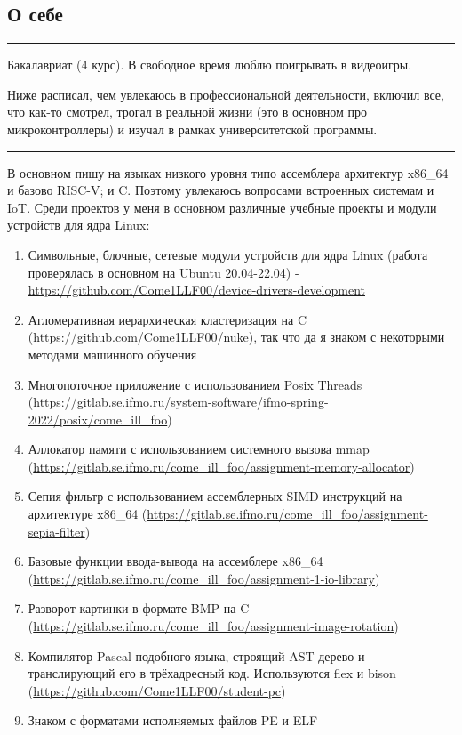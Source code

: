 \documentclass[10pt, final, twoside]{article}
\begin{document}
  \subsection*{\textcolor{darkgray2}{О себе}}
  \vspace*{-5.5mm}
  \par\noindent\rule{\textwidth}{0.1pt}
  
Бакалавриат (4 курс). В свободное время люблю поигрывать в видеоигры.

Ниже расписал, чем увлекаюсь в профессиональной деятельности, включил все, что как-то смотрел, трогал в реальной жизни (это в основном про микроконтроллеры) и изучал в рамках университетской программы.

\par\noindent\rule{\textwidth}{0.1pt}

В основном пишу на языках низкого уровня типо ассемблера архитектур x86\_64 и базово RISC-V; и C. Поэтому увлекаюсь вопросами встроенных системам и IoT. Среди проектов у меня в основном различные учебные проекты и модули устройств для ядра Linux:
\begin{enumerate}
  \item Символьные, блочные, сетевые модули устройств для ядра Linux (работа проверялась в основном на Ubuntu 20.04-22.04) - \url{https://github.com/Come1LLF00/device-drivers-development}
  \item Агломеративная иерархическая кластеризация на C (\url{https://github.com/Come1LLF00/nuke}), так что да я знаком с некоторыми методами машинного обучения
  \item Многопоточное приложение с использованием Posix Threads (\url{https://gitlab.se.ifmo.ru/system-software/ifmo-spring-2022/posix/come_ill_foo})
  \item Аллокатор памяти с использованием системного вызова mmap (\url{https://gitlab.se.ifmo.ru/come_ill_foo/assignment-memory-allocator})
  \item Сепия фильтр с использованием ассемблерных SIMD инструкций на архитектуре x86\_64 (\url{https://gitlab.se.ifmo.ru/come_ill_foo/assignment-sepia-filter})
  \item Базовые функции ввода-вывода на ассемблере x86\_64 (\url{https://gitlab.se.ifmo.ru/come_ill_foo/assignment-1-io-library})
  \item Разворот картинки в формате BMP на C (\url{https://gitlab.se.ifmo.ru/come_ill_foo/assignment-image-rotation})
  \item Компилятор Pascal-подобного языка, строящий AST дерево и транслирующий его в трёхадресный код. Используются flex и bison (\url{https://github.com/Come1LLF00/student-pc})
  \item Знаком с форматами исполняемых файлов PE и ELF
\end{enumerate}
\end{document}
